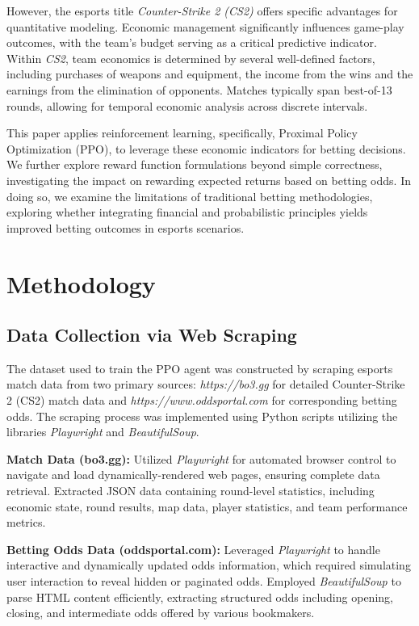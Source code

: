 \documentclass[sigconf]{acmart}
\begin{document}
However, the esports title \textit{Counter-Strike 2 (CS2)} offers specific advantages for quantitative modeling. Economic management significantly influences game-play outcomes, with the team's budget serving as a critical predictive indicator. Within \textit{CS2}, team economics is determined by several well-defined factors, including purchases of weapons and equipment, the income from the wins and the earnings from the elimination of opponents. Matches typically span best-of-13 rounds, allowing for temporal economic analysis across discrete intervals.


This paper applies reinforcement learning, specifically, Proximal Policy Optimization (PPO), to leverage these economic indicators for betting decisions. We further explore reward function formulations beyond simple correctness, investigating the impact on rewarding expected returns based on betting odds. In doing so, we examine the limitations of traditional betting methodologies, exploring whether integrating financial and probabilistic principles yields improved betting outcomes in esports scenarios.

\section{Methodology}

\subsection{Data Collection via Web Scraping}
The dataset used to train the PPO agent was constructed by scraping esports match data from two primary sources: \textit{https://bo3.gg} for detailed Counter-Strike 2 (CS2) match data and \textit{https://www.oddsportal.com} for corresponding betting odds. The scraping process was implemented using Python scripts utilizing the libraries \textit{Playwright} and \textit{BeautifulSoup}.

\bigskip

\textbf{Match Data (bo3.gg):}
Utilized \textit{Playwright} for automated browser control to navigate and load dynamically-rendered web pages, ensuring complete data retrieval.
Extracted JSON data containing round-level statistics, including economic state, round results, map data, player statistics, and team performance metrics.

\bigskip

\textbf{Betting Odds Data (oddsportal.com):}
Leveraged \textit{Playwright} to handle interactive and dynamically updated odds information, which required simulating user interaction to reveal hidden or paginated odds. Employed \textit{BeautifulSoup} to parse HTML content efficiently, extracting structured odds including opening, closing, and intermediate odds offered by various bookmakers.
\end{document}
